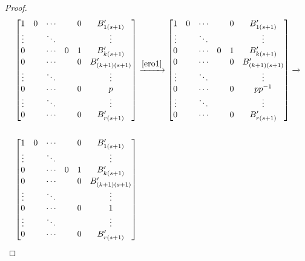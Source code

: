 \documentclass[12pt]{article}
\begin{document}
\begin{thm}
\begin{proof}
    \begin{align*}
      &\begin{bmatrix}
        1      & 0 & \cdots &   & 0 & B'_{1(s+1)}\\
        \vdots &   & \ddots &   &   & \vdots     \\
        0      &   & \cdots & 0 & 1 & B'_{k(s+1)}\\
        0      &   & \cdots &   & 0 & B'_{(k+1)(s+1)}\\
        \vdots &   & \ddots &   &   & \vdots     \\
        0      &   & \cdots &   & 0 & p\\
        \vdots &   & \ddots &   &   & \vdots     \\
        0      &   & \cdots &   & 0 & B'_{r(s+1)}
      \end{bmatrix}
      \xrightarrow{\eqref{ero1}}
      \begin{bmatrix}
        1      & 0 & \cdots &   & 0 & B'_{1(s+1)}\\
        \vdots &   & \ddots &   &   & \vdots     \\
        0      &   & \cdots & 0 & 1 & B'_{k(s+1)}\\
        0      &   & \cdots &   & 0 & B'_{(k+1)(s+1)}\\
        \vdots &   & \ddots &   &   & \vdots     \\
        0      &   & \cdots &   & 0 & pp^{-1}\\
        \vdots &   & \ddots &   &   & \vdots     \\
        0      &   & \cdots &   & 0 & B'_{r(s+1)}
      \end{bmatrix}
      \xrightarrow{}\\\\
      &\begin{bmatrix}
        1      & 0 & \cdots &   & 0 & B'_{1(s+1)}\\
        \vdots &   & \ddots &   &   & \vdots     \\
        0      &   & \cdots & 0 & 1 & B'_{k(s+1)}\\
        0      &   & \cdots &   & 0 & B'_{(k+1)(s+1)}\\
        \vdots &   & \ddots &   &   & \vdots     \\
        0      &   & \cdots &   & 0 & 1\\
        \vdots &   & \ddots &   &   & \vdots     \\
        0      &   & \cdots &   & 0 & B'_{r(s+1)}
      \end{bmatrix}

\end{align*}
\end{proof}
\end{thm}
\end{document}
